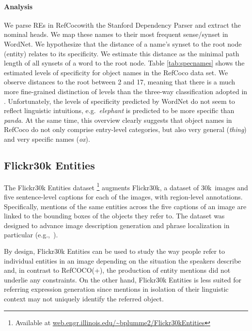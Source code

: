 \documentclass[runningheads]{llncs}
\newcommand{\refcoco}{RefCOCO\xspace}
\newcommand{\flickr}{Flickr30k Entities\xspace}
\newcommand{\refexp}[1]{\textsl{#1}}
\begin{document}
\paragraph{Analysis} We parse REs in RefCocowith the Stanford Dependency Parser and extract the nominal heads. We map these names to their most frequent sense/synset in WordNet.
We hypothesize that the distance of a name's synset to the root node (entity) relates to its specificity.
We estimate this distance as the minimal path length of all synsets of a word  to the root node.
Table \ref{tab:specnames} shows the estimated levels of specificity for object names in the RefCoco data set.
We observe distances to the root between 2 and 17, meaning that there is a much more fine-grained distinction of levels than the three-way classification adopted in \cite{graf2016animal}.
Unfortunately, the levels of specificity predicted by WordNet do not seem to reflect linguistic intuitions, e.g.\ \refexp{elephant} is predicted to be more specific than \refexp{panda}.
At the same time, this overview clearly suggests that object names in RefCoco do not only comprise entry-level categories, but also very general (\refexp{thing}) and very specific names (\refexp{ox}).



\subsection{Flickr30k Entities}
The \flickr dataset \cite{plummer2015flickr30kentities}\footnote{Available at  \url{web.engr.illinois.edu/~bplumme2/Flickr30kEntities}}  augments Flickr30k, a dataset of 30k~images and five sentence-level captions for each of the images, with region-level annotations. 
Specifically, mentions of the same entities across the five captions of an image are linked to the bounding boxes of the objects they refer to. 
The dataset was designed to advance image description generation and phrase localization in particular (e.g.,~\cite{rohrbach2016grounding,plummer2017phrase,yeh2018unsupervised}). 

By design, \flickr can be used to study the way people refer to individual entities in an image depending on the situation the speakers describe and,  
in contrast to \refcoco(+), the production of entity mentions did not underlie any constraints. 
On the other hand, \flickr is less suited for referring expression generation since mentions in isolation of their linguistic context may not uniquely identify the referred object. 
\end{document}
